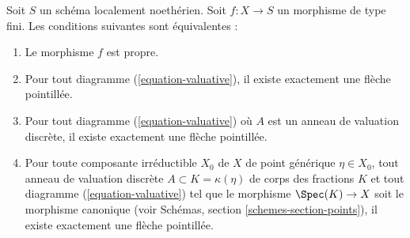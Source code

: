 \begin{lemma}
\label{lemma-Noetherian-dvr-valuative-proper}
Soit $S$ un schéma localement noethérien.
Soit $f : X \to S$ un morphisme de type fini.
Les conditions suivantes sont équivalentes :
\begin{enumerate}
\item Le morphisme $f$ est propre.
\item Pour tout diagramme (\ref{equation-valuative}), il existe exactement
une flèche pointillée.
\item Pour tout diagramme (\ref{equation-valuative}) où $A$ est un anneau
de valuation discrète, il existe exactement une flèche pointillée.
\item Pour toute composante irréductible $X_0$ de $X$ de
point générique $\eta \in X_0$, tout anneau de valuation discrète
$A \subset K = \kappa(\eta)$ de corps des fractions $K$ et tout
diagramme (\ref{equation-valuative}) tel que
le morphisme $\Spec(K) \to X$ soit le morphisme canonique
(voir
Schémas, section \ref{schemes-section-points}),
il existe exactement une flèche pointillée.
\end{enumerate}
\end{lemma}

